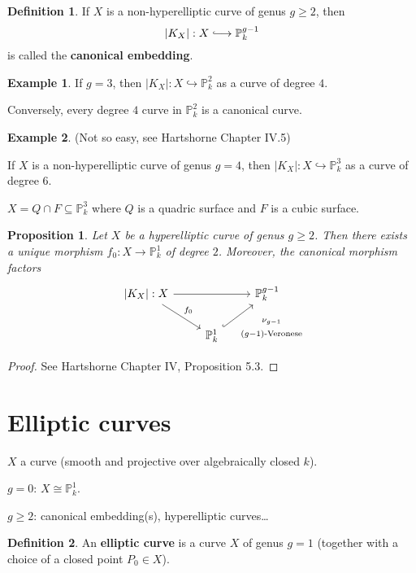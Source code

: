 \documentclass[12pt]{article}
\newtheorem*{proposition}{Proposition}
\theoremstyle{definition}
\newtheorem*{definition}{Definition}
\newtheorem*{example}{Example}
\begin{document}
\begin{definition}
If $X$ is a non-hyperelliptic curve of genus $g\geq2$, then
\[|K_X|:X\lhook\joinrel\longrightarrow\mathbb{P}_k^{g-1}\]
is called the \textbf{canonical embedding}.
\end{definition}

\begin{example}
If $g=3$, then $|K_X|:X\hookrightarrow\mathbb{P}_k^2$ as a curve of degree $4$.

Conversely, every degree $4$ curve in $\mathbb{P}_k^2$ is a canonical curve.
\end{example}

\begin{example}
(Not so easy, see Hartshorne \cite{hartshorne2013algebraic} Chapter IV.5)

If $X$ is a non-hyperelliptic curve of genus $g=4$, then $|K_X|:X\hookrightarrow\mathbb{P}_k^3$ as a curve of degree $6$.

$X=Q\cap F\subseteq\mathbb{P}_k^3$ where $Q$ is a quadric surface and $F$ is a cubic surface.
\end{example}

\begin{proposition}
Let $X$ be a hyperelliptic curve of genus $g\geq2$. Then there exists a unique morphism $f_0:X\rightarrow\mathbb{P}_k^1$ of degree $2$. Moreover, the canonical morphism factors
\[
\begin{tikzcd}
{|K_X|:X}\arrow[rr]\arrow[rd,"f_0"]&&\mathbb{P}_k^{g-1}\\
&\mathbb{P}_k^1\arrow[ru,hook,"\substack{\nu_{g-1}\\\\(g-1)\text{-Veronese}}",swap]
\end{tikzcd}
\]
\end{proposition}

\begin{proof}
See Hartshorne \cite{hartshorne2013algebraic} Chapter IV, Proposition 5.3.
\end{proof}

\section{Elliptic curves}
$X$ a curve (smooth and projective over algebraically closed $k$).

$g=0$: $X\cong\mathbb{P}_k^1$.

$g\geq2$: canonical embedding(s), hyperelliptic curves\ldots

\begin{definition}
An \textbf{elliptic curve} is a curve $X$ of genus $g=1$ (together with a choice of a closed point $P_0\in X$).
\end{definition}
\end{document}
